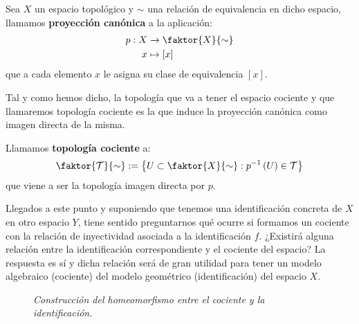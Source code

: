 \begin{defi}
Sea $X$ un espacio topológico y $\sim$ una relación de equivalencia en dicho espacio, llamamos \textbf{proyección canónica} a la aplicación:
\begin{align*}
    p: X &\rightarrow \faktor{X}{\sim}\\ 
    x &\mapsto \left[ x \right]
\end{align*}
que a cada elemento $x$ le asigna su clase de equivalencia $\left[ x \right]$.
\end{defi}

Tal y como hemos dicho, la topología que va a tener el espacio cociente y que llamaremos topología cociente es la que induce la proyección canónica como imagen directa de la misma.

\begin{defi}
Llamamos \textbf{topología cociente} a: 
\[
    \faktor{\mathcal{T}}{\sim} := \left\{ U \subset \faktor{X}{\sim}: p ^{-1}\left( U \right) \in \mathcal{T} \right\}
\]
que viene a ser la topología imagen directa por $p$.
\end{defi}

Llegados a este punto y suponiendo que tenemos una identificación concreta de $X$ en otro espacio $Y$, tiene sentido preguntarnos qué ocurre si formamos un cociente con la relación de inyectividad asociada a la identificación $f$. ¿Existirá alguna relación entre la identificación correspondiente y el cociente del espacio? La respuesta es sí y dicha relación será de gran utilidad para tener un modelo algebraico (cociente) del modelo geométrico (identificación) del espacio $X$.

\begin{figure}[H]
    \centering    
        \caption{\textit{Construcción del homeomorfismo entre el cociente y la identificación.}}
        \label{fig:coci}
\end{figure}

